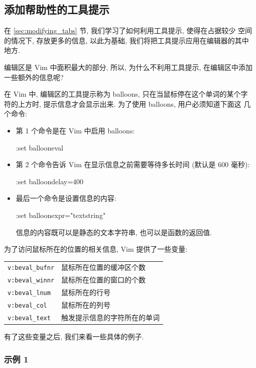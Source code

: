 \subsection{添加帮助性的工具提示}
\label{subsec:adding_helpful_tool_tips}

在 \ref{sec:modifying_tabs} 节, 我们学习了如何利用工具提示, 使得在占据较少
空间的情况下, 存放更多的信息, 以此为基础, 我们将把工具提示应用在编辑器的其中
地方.

编辑区是 Vim 中面积最大的部分, 所以, 为什么不利用工具提示, 在编辑区中添加
一些额外的信息呢?

在 Vim 中, 编辑区的工具提示称为 balloons, 只在当鼠标停在这个单词的某个字
符的上方时, 提示信息才会显示出来. 为了使用 balloons, 用户必须知道下面这
几个命令:
\begin{itemize}
    \item 第 1 个命令是在 Vim 中启用 balloons:
    \begin{vimcmd}
    :set ballooneval
    \end{vimcmd}
    \item 第 2 个命令告诉 Vim 在显示信息之前需要等待多长时间 (默认是 600
    毫秒):
    \begin{vimcmd}
    :set balloondelay=400
    \end{vimcmd}
    \item 最后一个命令是设置信息的内容:
    \begin{vimcmd}
    :set balloonexpr="textstring"
    \end{vimcmd}
    信息的内容既可以是静态的文本字符串, 也可以是函数的返回值.
\end{itemize}

为了访问鼠标所在的位置的相关信息, Vim 提供了一些变量:
\begin{center}
\begin{tabular}{ll}
    \hline
    \texttt{v:beval\_bufnr} & 鼠标所在位置的缓冲区个数 \\
    \texttt{v:beval\_winnr} & 鼠标所在位置的窗口的个数 \\
    \texttt{v:beval\_lnum}  & 鼠标所在的行号 \\
    \texttt{v:beval\_col}   & 鼠标所在的列号 \\
    \texttt{v:beval\_text}  & 触发提示信息的字符所在的单词 \\
    \hline
\end{tabular}
\end{center}
有了这些变量之后, 我们来看一些具体的例子.

\subsubsection{示例 1}
\label{subsubsec:example_1}

